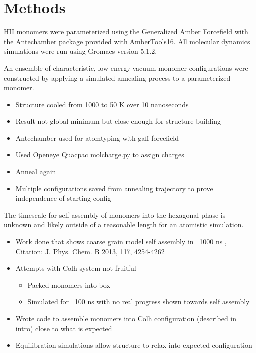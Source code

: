 \documentclass{article}
\begin{document}
	\section{Methods}
	
	HII monomers were parameterized using the Generalized Amber Forcefield with the Antechamber package provided with AmberTools16. All molecular dynamics simulations were run using Gromacs version 5.1.2.

	An ensemble of characteristic, low-energy vacuum monomer configurations were constructed by applying a simulated annealing process to a parameterized monomer.
	\begin{itemize}
		\item Structure cooled from 1000 to 50 K over 10 nanoseconds
		\item Result not global minimum but close enough for structure building
		\item Antechamber used for atomtyping with gaff forcefield
		\item Used Openeye Quacpac molcharge.py to assign charges
		\item Anneal again 
		\item Multiple configurations saved from annealing trajectory to prove independence of starting config
	\end{itemize}

	The timescale for self assembly of monomers into the hexagonal phase is unknown and likely outside of a reasonable length for an atomistic simulation. 
	\begin{itemize}
		\item Work done that shows coarse grain model self assembly in ~1000 ns , Citation: J. Phys. Chem. B 2013, 117, 4254-4262
		\item Attempts with Colh system not fruitful  
		\begin{itemize}
			\item Packed monomers into box
			\item Simulated for ~100 ns with no real progress shown towards self assembly
		\end{itemize}  
		\item Wrote code to assemble monomers into Colh configuration (described in intro) close to what is expected 
		\item Equilibration simulations allow structure to relax into expected configuration 
	\end{itemize}
\end{document}
